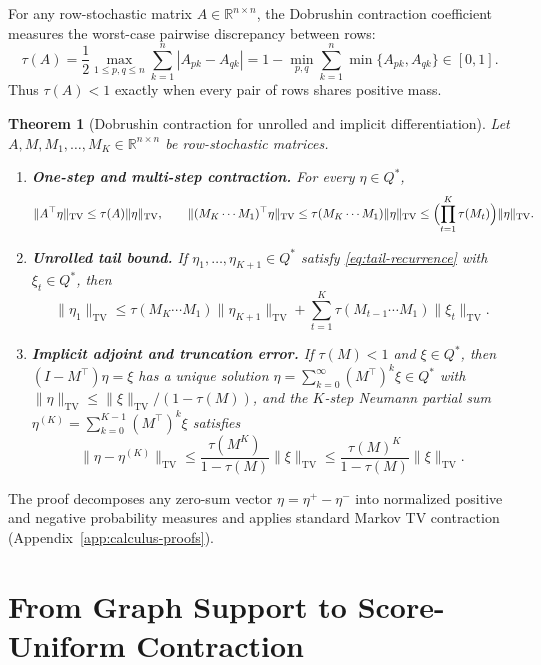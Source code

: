 \documentclass[10pt]{article}
\newtheorem{theorem}{Theorem}
\newcommand{\TV}{\mathrm{TV}}
\begin{document}
For any row-stochastic matrix $A \in \mathbb{R}^{n\times n}$, the Dobrushin contraction coefficient \citep{dobrushin1956central,gaubert2013dobrushin,levin2017markov} measures the worst-case pairwise discrepancy between rows:
\[
  \tau(A) = \frac{1}{2} \max_{1 \le p,q \le n} \sum_{k=1}^n |A_{pk} - A_{qk}|
  = 1 - \min_{p,q} \sum_{k=1}^n \min\{A_{pk}, A_{qk}\} \in [0, 1].
\]
Thus $\tau(A) < 1$ exactly when every pair of rows shares positive mass.

\begin{theorem}[Dobrushin contraction for unrolled and implicit differentiation]
\label{thm:dobrushin-contraction}
Let $A, M, M_1, \dots, M_K \in \mathbb{R}^{n\times n}$ be row-stochastic matrices.
\begin{enumerate}[leftmargin=1.5em]
  \item \textbf{One-step and multi-step contraction.} For every $\eta \in Q^*$,
  \[
    \|A^\top \eta\|_{\TV} \le \tau(A)\|\eta\|_{\TV},
    \qquad
    \|(M_K \cdots M_1)^\top \eta\|_{\TV} \le \tau(M_K \cdots M_1)\|\eta\|_{\TV} \le \Bigl(\prod_{t=1}^K \tau(M_t)\Bigr)\|\eta\|_{\TV}.
  \]
  \item \textbf{Unrolled tail bound.} If $\eta_1, \dots, \eta_{K+1} \in Q^*$ satisfy \eqref{eq:tail-recurrence} with $\xi_t \in Q^*$, then
  \begin{equation}
  \label{eq:inhomogeneous-tail-bound}
    \|\eta_1\|_{\TV} \le \tau(M_K \cdots M_1)\|\eta_{K+1}\|_{\TV}
    + \sum_{t=1}^K \tau(M_{t-1}\cdots M_1)\|\xi_t\|_{\TV}.
  \end{equation}
  \item \textbf{Implicit adjoint and truncation error.} If $\tau(M) < 1$ and $\xi \in Q^*$, then $(I - M^\top)\eta = \xi$ has a unique solution $\eta = \sum_{k=0}^\infty (M^\top)^k \xi \in Q^*$ with $\|\eta\|_{\TV} \le \|\xi\|_{\TV}/(1-\tau(M))$, and the $K$-step Neumann partial sum $\eta^{(K)} = \sum_{k=0}^{K-1} (M^\top)^k \xi$ satisfies
  \[
    \|\eta - \eta^{(K)}\|_{\TV}
    \le \frac{\tau(M^K)}{1-\tau(M)}\|\xi\|_{\TV}
    \le \frac{\tau(M)^K}{1-\tau(M)}\|\xi\|_{\TV}.
  \]
\end{enumerate}
\end{theorem}

The proof decomposes any zero-sum vector $\eta = \eta^+ - \eta^-$ into normalized positive and negative probability measures and applies standard Markov TV contraction (Appendix~\ref{app:calculus-proofs}).

\section{From Graph Support to Score-Uniform Contraction}
\label{sec:baselines}
\label{sec:face-lattice}
\end{document}
